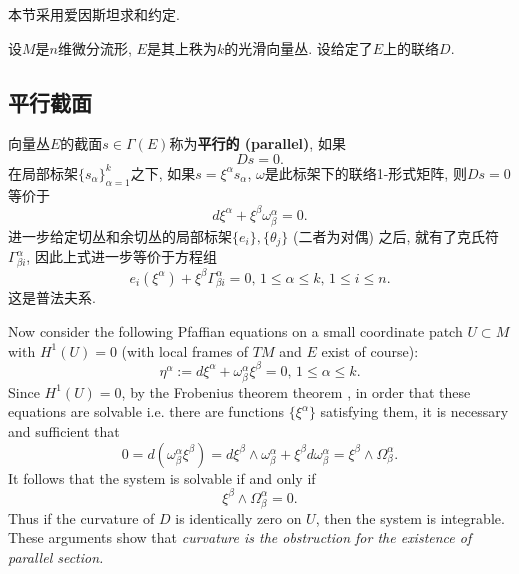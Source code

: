 
本节采用爱因斯坦求和约定.

设$M$是$n$维微分流形, $E$是其上秩为$k$的光滑向量丛. 设给定了$E$上的联络$D$.

\subsection{平行截面}

向量丛$E$的截面$s\in\Gamma(E)$称为\textbf{平行的 (parallel)}, 如果
$$Ds=0.$$
在局部标架$\{s_\alpha\}_{\alpha=1}^k$之下, 如果$s=\xi^\alpha s_\alpha$, $\omega$是此标架下的联络1-形式矩阵, 则$Ds=0$等价于
$$
d\xi^\alpha+\xi^\beta\omega^\alpha_\beta=0.
$$
进一步给定切丛和余切丛的局部标架$\{e_i\},\{\theta_j\}$ (二者为对偶) 之后, 就有了克氏符$\Gamma_{\beta i}^\alpha$, 因此上式进一步等价于方程组
$$
e_i(\xi^\alpha)+\xi^\beta\Gamma^\alpha_{\beta i}=0,\,1\leq \alpha\leq k,\,1\leq i\leq n.
$$
这是普法夫系.

Now consider the following Pfaffian equations on a small coordinate patch $U\subset M$ with $H^1(U)=0$ (with local frames of $TM$ and $E$ exist of course):
$$\eta^\alpha:=d\xi^\alpha+\omega^\alpha_\beta\xi^\beta=0,\,1\leq\alpha\leq k.$$
Since $H^1(U)=0$, by the Frobenius theorem theorem , in order that these equations are solvable i.e. there are functions $\{\xi^\alpha\}$ satisfying them, it is necessary and sufficient that
$$0=d(\omega^\alpha_\beta\xi^\beta)=d\xi^\beta\wedge\omega^\alpha_\beta+\xi^\beta d\omega^\alpha_\beta=\xi^\beta\wedge\Omega_\beta^\alpha.$$
It follows that the system is solvable if and only if
$$\xi^\beta\wedge\Omega_\beta^\alpha=0.$$
Thus if the curvature of $D$ is identically zero on $U$, then the system is integrable. These arguments show that \emph{curvature is the obstruction for the existence of parallel section.}

